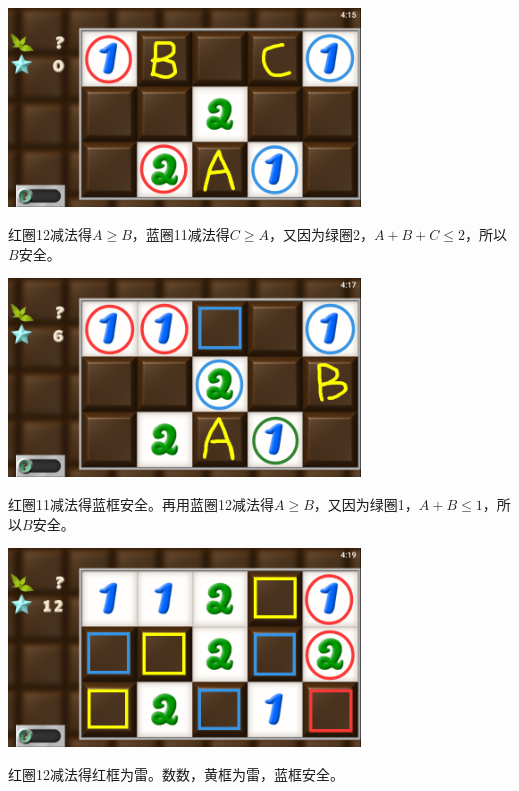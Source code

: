\subsection{} %
\begin{center}
    \includegraphics[width=0.7\textwidth]{puzzle/93-1.png}
\end{center}
红圈12减法得$A\ge B$，蓝圈11减法得$C\ge A$，又因为绿圈2，$A+B+C\le 2$，所以$B$安全。
\begin{center}
    \includegraphics[width=0.7\textwidth]{puzzle/93-2.png}
\end{center}
红圈11减法得蓝框安全。再用蓝圈12减法得$A\ge B$，又因为绿圈1，$A+B\le 1$，所以$B$安全。
\begin{center}
    \includegraphics[width=0.7\textwidth]{puzzle/93-3.png}
\end{center}
红圈12减法得红框为雷。数数，黄框为雷，蓝框安全。

